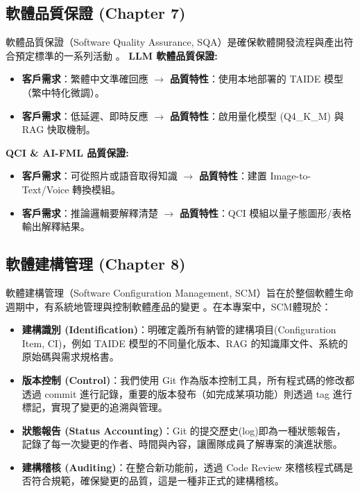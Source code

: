 \documentclass[twocolumn,11pt,a4paper]{article}
\begin{document}
\subsection{軟體品質保證 (Chapter 7)}
軟體品質保證（Software Quality Assurance, SQA）是確保軟體開發流程與產出符合預定標準的一系列活動 \cite{lee2024se}。
\textbf{LLM 軟體品質保證:}
\begin{itemize}
    \item \textbf{客戶需求}：繁體中文準確回應 $\rightarrow$ \textbf{品質特性}：使用本地部署的 TAIDE 模型（繁中特化微調）。
    \item \textbf{客戶需求}：低延遲、即時反應 $\rightarrow$ \textbf{品質特性}：啟用量化模型 (Q4\_K\_M) 與 RAG 快取機制。
\end{itemize}
\textbf{QCI \& AI-FML 品質保證:}
\begin{itemize}
    \item \textbf{客戶需求}：可從照片或語音取得知識 $\rightarrow$ \textbf{品質特性}：建置 Image-to-Text/Voice 轉換模組。
    \item \textbf{客戶需求}：推論邏輯要解釋清楚 $\rightarrow$ \textbf{品質特性}：QCI 模組以量子態圖形/表格輸出解釋結果。
\end{itemize}

\subsection{軟體建構管理 (Chapter 8)}
軟體建構管理（Software Configuration Management, SCM）旨在於整個軟體生命週期中，有系統地管理與控制軟體產品的變更 \cite{lee2024se}。在本專案中，SCM體現於：
\begin{itemize}
    \item \textbf{建構識別 (Identification)}：明確定義所有納管的建構項目(Configuration Item, CI)，例如 TAIDE 模型的不同量化版本、RAG 的知識庫文件、系統的原始碼與需求規格書。
    \item \textbf{版本控制 (Control)}：我們使用 Git 作為版本控制工具，所有程式碼的修改都透過 commit 進行記錄，重要的版本發布（如完成某項功能）則透過 tag 進行標記，實現了變更的追溯與管理。
    \item \textbf{狀態報告 (Status Accounting)}：Git 的提交歷史(log)即為一種狀態報告，記錄了每一次變更的作者、時間與內容，讓團隊成員了解專案的演進狀態。
    \item \textbf{建構稽核 (Auditing)}：在整合新功能前，透過 Code Review 來稽核程式碼是否符合規範，確保變更的品質，這是一種非正式的建構稽核。
\end{itemize}
\end{document}
